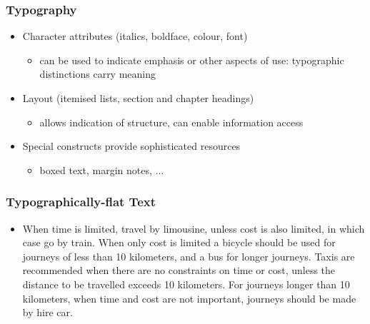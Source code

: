 \documentclass[compress,color=usenames]{beamer}
\begin{document}
\begin{frame}
\frametitle{
Typography}

\label{f73}
\begin{itemize}
\item {{Character attributes (italics, boldface, colour, font)}}
\begin{itemize}
\item can be used to indicate emphasis or other aspects of use:  typographic distinctions carry meaning
\end{itemize}
\item {{Layout (itemised lists, section and chapter headings)}}
\begin{itemize}
\item allows indication of structure, can enable information access
\end{itemize}
\item {{Special constructs provide sophisticated resources}}
\begin{itemize}
\item boxed text, margin notes, ...
\end{itemize}
\end{itemize}
 
\end{frame}

\begin{frame}
\frametitle{
Typographically-flat Text}

\label{f75}
\begin{itemize}
\item {{When time is limited, travel by limousine, unless cost is also limited, in which case go by train.  When only cost is limited a bicycle should be used for journeys of less than 10 kilometers, and a bus for longer journeys.  Taxis are recommended when there are no constraints on time or cost, unless the distance to be travelled exceeds 10 kilometers.  For journeys longer than 10  kilometers, when time and cost are not important, journeys should be made by hire car.}}
\end{itemize}
 
\end{frame}
\end{document}
